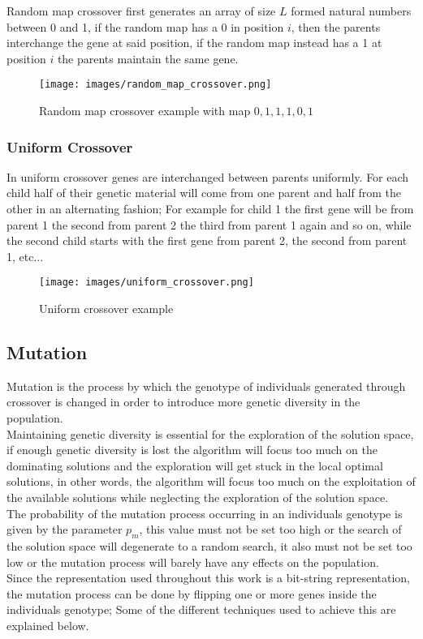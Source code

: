 	Random map crossover first generates an array of size $L$ formed natural numbers between 0 and 1, if the random map has a 0 in position $i$, then the parents interchange the gene at said position, if the random map instead has a 1 at position $i$ the parents maintain the same gene. 

	\begin{figure}[!htb]
	\centering
	\texttt{[image: images/random\_map\_crossover.png]}
	\caption{Random map crossover example with map ${0,1,1,1,0,1}$}
	\label{fig:Random map crossover}
	\end{figure}

	\subsubsection{Uniform Crossover}

	In uniform crossover genes are interchanged between parents uniformly. For each child half of their genetic material will come from one parent and half from the other in an alternating fashion; For example for child 1 the first gene will be from parent 1 the second from parent 2 the third from parent 1 again and so on, while the second child starts with the first gene from parent 2, the second from parent 1, etc...

	\begin{figure}[!htb]
	\centering
	\texttt{[image: images/uniform\_crossover.png]}
	\caption{Uniform crossover example}
	\label{fig:Uniform crossover}
	\end{figure}

\subsection{Mutation}
Mutation is the process by which the genotype of individuals generated through crossover is changed in order to introduce more genetic diversity in the population.
\\Maintaining genetic diversity is essential for the exploration of the solution space, if enough genetic diversity is lost the algorithm will focus too much on the dominating solutions and the exploration will get stuck in the local optimal solutions, in other words, the algorithm will focus too much on the exploitation of the available solutions while neglecting the exploration of the solution space.
\\The probability of the mutation process occurring in an individuals genotype is given by the parameter $p_m$, this value must not be set too high or the search of the solution space will degenerate to a random search, it also must not be set too low or the mutation process will barely have any effects on the population.
\\Since the representation used throughout this work is a bit-string representation, the mutation process can be done by flipping one or more genes inside the individuals genotype; Some of the different techniques used to achieve this are explained below.

